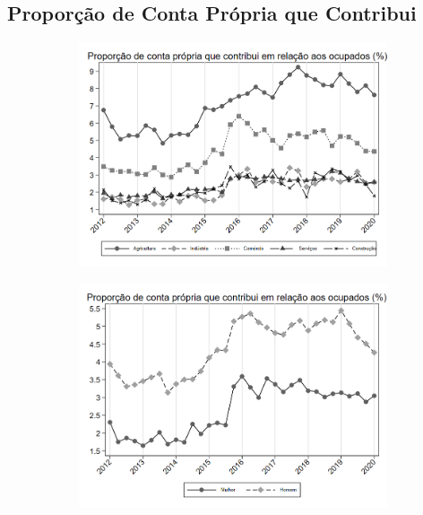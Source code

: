 \documentclass[11pt]{beamer}
\begin{document}
\subsection{Proporção de Conta Própria que Contribui}

\begin{frame}
\begin{figure}[h!tpb]
\centering
\begin{subfigure}{.5\textwidth}
  \centering
  \includegraphics[width=.95\linewidth]{../../analysis/output/composicao_demografica/setor/_composicao_demografica_setor_prop_cpropriaC.png}
  \label{fig:_composicao_demografica_setor_prop_cpropriaC}
\end{subfigure}%
\begin{subfigure}{.5\textwidth}
  \centering
  \includegraphics[width=.95\linewidth]{../../analysis/output/composicao_demografica/genero/_composicao_demografica_genero_prop_cpropriaC.png}
  \label{fig:_composicao_demografica_genero_prop_cpropriaC}
\end{subfigure}


\end{figure}
\end{frame}
\end{document}
